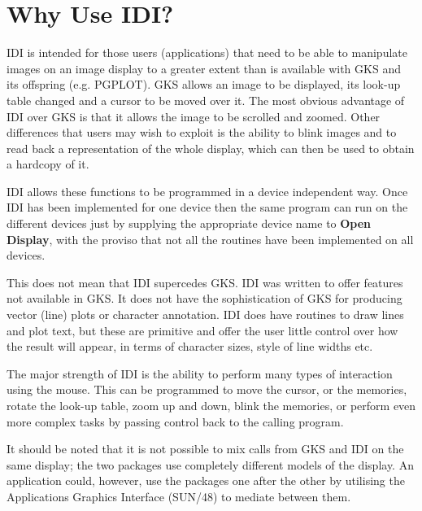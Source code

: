 \setlength{\parskip}{0mm}
\tableofcontents
\setlength{\parskip}{\medskipamount}
\markright{\stardocname}

\newpage

\section{Why Use IDI?}

IDI is intended for those users (applications) that need to be able to
manipulate images on an image display to a greater extent than is
available with GKS and its offspring (e.g. PGPLOT). GKS allows an image to
be displayed, its look-up table changed and a cursor to be moved over it.
The most obvious advantage of IDI over GKS is that it allows the image
to be scrolled and zoomed. Other differences that users may wish to exploit
is the ability to blink images and to read back a representation of
the whole display, which can then be used to obtain a hardcopy of it.

IDI allows these functions to be programmed in a device independent way.
Once IDI has been implemented for one device then the same program can
run on the different devices just by supplying the appropriate device name
to {\bf Open Display}, with the proviso that not all the routines have
been implemented on all devices.

This does not mean that IDI supercedes GKS. IDI was written to offer
features not available in GKS. It does not have the sophistication of
GKS for producing vector (line) plots or character annotation. IDI
does have routines to draw lines and plot text, but these are primitive
and offer the user little control over how the result will appear, in
terms of character sizes, style of line widths etc.

The major strength of IDI is the ability to perform many types of
interaction using the mouse. This can be programmed to move the cursor,
or the memories, rotate the look-up table, zoom up and down, blink the
memories, or perform even more complex tasks by passing control back
to the calling program.

It should be noted that it is not possible to mix calls from GKS and IDI
on the same display; the two packages use completely different models
of the display. An application could, however, use the packages one after
the other by utilising the Applications Graphics Interface (SUN/48) to
mediate between them.


